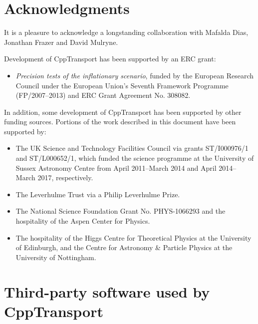 \documentclass[11pt,a4paper]{article}
\newcommand{\packagefont}{\sffamily}
\newcommand{\CppTransport}{{\packagefont CppTransport}}
\begin{document}
\section{Acknowledgments}
It is a pleasure to acknowledge a longstanding collaboration
with
Mafalda Dias,
Jonathan Frazer
and David Mulryne.

Development of {\CppTransport} has been supported
by an ERC grant:
\begin{itemize}
    \item \emph{Precision tests of the inflationary
    scenario},
    funded by
    the European Research Council under the European Union's
    Seventh Framework Programme (FP/2007--2013) and ERC Grant Agreement No. 308082.
\end{itemize}
In addition,
some development of {\CppTransport} has been supported by
other funding sources.
Portions of
the work described in this document have been supported by:
\begin{itemize}
    \item The UK
    Science and Technology Facilities Council via grants
    ST/I000976/1 and ST/L000652/1,
    which funded the science programme at the University of Sussex Astronomy
    Centre from April 2011--March 2014
    and April 2014--March 2017, respectively.
    \item The Leverhulme Trust via a Philip Leverhulme Prize.
    \item The National Science Foundation Grant No. PHYS-1066293
    and the hospitality of the Aspen Center for Physics.
    \item The hospitality of the Higgs Centre for Theoretical
    Physics at the University of Edinburgh,
    and the Centre for Astronomy \& Particle Physics
    at the University of Nottingham.
\end{itemize}

\appendix

\section{Third-party software used by {\CppTransport}}



\end{document}

